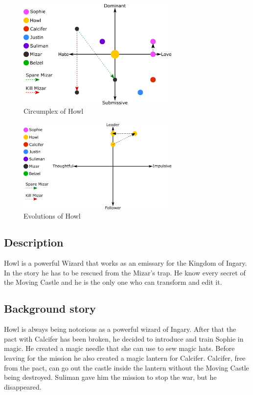 \begin{figure}[H]
  \centering
  \includegraphics[width=8cm]{Images/Circumplexes/howlCircumplex}
  \caption{Circumplex of Howl}
\end{figure}

\begin{figure}[H]
  \centering
  \includegraphics[width=8cm]{Images/Evolutions/howlEvolution}
  \caption{Evolutions of Howl}
\end{figure}


\subsection{Description}
Howl is a powerful Wizard that works as an emissary for the Kingdom of Ingary. In the story he has to be rescued from the Mizar’s trap. He know every secret of the Moving Castle and he is the only one who can transform and edit it.

\subsection{Background story}
Howl is always being notorious as a powerful wizard of Ingary. After that the pact with Calcifer has been broken, he decided to introduce and train Sophie in magic. He created a magic needle that she can use to sew magic hats. Before leaving for the mission he also created a magic lantern for Calcifer. Calcifer, free from the pact, can go out the castle inside the lantern without the Moving Castle being destroyed. Suliman gave him the mission to stop the war, but he disappeared.
